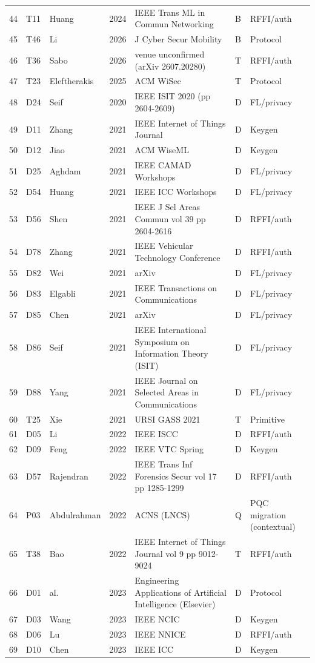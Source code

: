\begin{table}[p]
\begin{tabular}{@{}lllll>{\raggedright\arraybackslash}p{3.3cm}>{\raggedright\arraybackslash}p{1.9cm}@{}}
44 & T11 & Huang & 2024 & IEEE Trans ML in Commun Networking & B & RFFI/auth \\
45 & T46 & Li & 2026 & J Cyber Secur Mobility & B & Protocol \\
46 & T36 & Sabo & 2026 & venue unconfirmed (arXiv 2607.20280) & T & RFFI/auth \\
47 & T23 & Eleftherakis & 2025 & ACM WiSec & T & Protocol \\
48 & D24 & Seif & 2020 & IEEE ISIT 2020 (pp 2604-2609) & D & FL/privacy \\
49 & D11 & Zhang & 2021 & IEEE Internet of Things Journal & D & Keygen \\
50 & D12 & Jiao & 2021 & ACM WiseML & D & Keygen \\
51 & D25 & Aghdam & 2021 & IEEE CAMAD Workshops & D & FL/privacy \\
52 & D54 & Huang & 2021 & IEEE ICC Workshops & D & FL/privacy \\
53 & D56 & Shen & 2021 & IEEE J Sel Areas Commun vol 39 pp 2604-2616 & D & RFFI/auth \\
54 & D78 & Zhang & 2021 & IEEE Vehicular Technology Conference & D & RFFI/auth \\
55 & D82 & Wei & 2021 & arXiv & D & FL/privacy \\
56 & D83 & Elgabli & 2021 & IEEE Transactions on Communications & D & FL/privacy \\
57 & D85 & Chen & 2021 & arXiv & D & FL/privacy \\
58 & D86 & Seif & 2021 & IEEE International Symposium on Information Theory (ISIT) & D & FL/privacy \\
59 & D88 & Yang & 2021 & IEEE Journal on Selected Areas in Communications & D & FL/privacy \\
60 & T25 & Xie & 2021 & URSI GASS 2021 & T & Primitive \\
61 & D05 & Li & 2022 & IEEE ISCC & D & RFFI/auth \\
62 & D09 & Feng & 2022 & IEEE VTC Spring & D & Keygen \\
63 & D57 & Rajendran & 2022 & IEEE Trans Inf Forensics Secur vol 17 pp 1285-1299 & D & RFFI/auth \\
64 & P03 & Abdulrahman & 2022 & ACNS (LNCS) & Q & PQC migration (contextual) \\
65 & T38 & Bao & 2022 & IEEE Internet of Things Journal vol 9 pp 9012-9024 & T & RFFI/auth \\
66 & D01 & al. & 2023 & Engineering Applications of Artificial Intelligence (Elsevier) & D & Protocol \\
67 & D03 & Wang & 2023 & IEEE NCIC & D & Keygen \\
68 & D06 & Lu & 2023 & IEEE NNICE & D & RFFI/auth \\
69 & D10 & Chen & 2023 & IEEE ICC & D & Keygen \\\bottomrule
\end{tabular}
\end{table}
